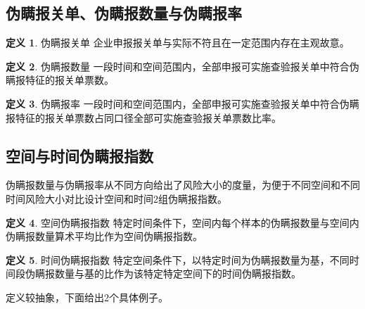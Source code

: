 \documentclass[a4paper]{tufte-book}%
\theoremstyle{definition}
\newtheorem{Definition}{\hspace{2em}定义}[section]
\theoremstyle{definition}
\begin{document}
\subsection{伪瞒报关单、伪瞒报数量与伪瞒报率}
\begin{Definition}{伪瞒报关单}
	企业申报报关单与实际不符且在一定范围内存在主观故意。
\end{Definition}
\begin{Definition}{伪瞒报数量}
	一段时间和空间范围内，全部申报可实施查验报关单中符合伪瞒报特征的报关单票数。
\end{Definition}
\begin{Definition}{伪瞒报率}
	一段时间和空间范围内，全部申报可实施查验报关单中符合伪瞒报特征的报关单票数占同口径全部可实施查验报关单票数比率。
\end{Definition}



\subsection{空间与时间伪瞒报指数}
伪瞒报数量与伪瞒报率从不同方向给出了风险大小的度量，为便于不同空间和不同时间风险大小对比设计空间和时间2组伪瞒报指数。
\begin{Definition}{空间伪瞒报指数}
	特定时间条件下，空间内每个样本的伪瞒报数量与空间内伪瞒报数量算术平均比作为空间伪瞒报指数。
\end{Definition}

\begin{Definition}{时间伪瞒报指数}
	特定空间条件下，以特定时间为伪瞒报数量为基，不同时间段伪瞒报数量与基的比作为该特定特定空间下的时间伪瞒报指数。
\end{Definition}

定义较抽象，下面给出2个具体例子。
\end{document}

